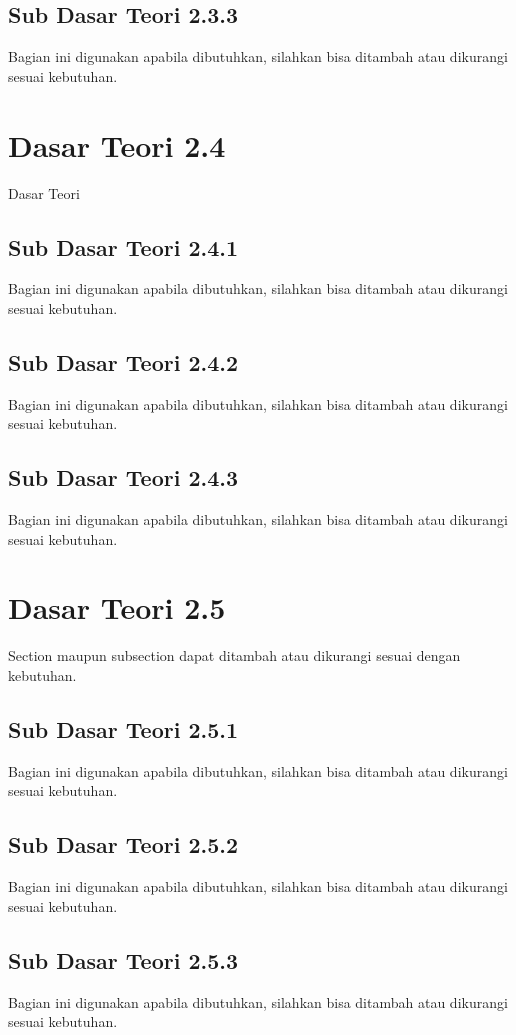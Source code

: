 \subsection{Sub Dasar Teori 2.3.3}
Bagian ini digunakan apabila dibutuhkan, silahkan bisa ditambah atau dikurangi sesuai kebutuhan.

\section{Dasar Teori 2.4}
Dasar Teori

\subsection{Sub Dasar Teori 2.4.1}
Bagian ini digunakan apabila dibutuhkan, silahkan bisa ditambah atau dikurangi sesuai kebutuhan.

\subsection{Sub Dasar Teori 2.4.2}
Bagian ini digunakan apabila dibutuhkan, silahkan bisa ditambah atau dikurangi sesuai kebutuhan.

\subsection{Sub Dasar Teori 2.4.3}
Bagian ini digunakan apabila dibutuhkan, silahkan bisa ditambah atau dikurangi sesuai kebutuhan.

\section{Dasar Teori 2.5}
\noindent Section maupun subsection dapat ditambah atau dikurangi sesuai dengan kebutuhan.

\subsection{Sub Dasar Teori 2.5.1}
Bagian ini digunakan apabila dibutuhkan, silahkan bisa ditambah atau dikurangi sesuai kebutuhan.

\subsection{Sub Dasar Teori 2.5.2}
Bagian ini digunakan apabila dibutuhkan, silahkan bisa ditambah atau dikurangi sesuai kebutuhan.

\subsection{Sub Dasar Teori 2.5.3}
Bagian ini digunakan apabila dibutuhkan, silahkan bisa ditambah atau dikurangi sesuai kebutuhan.
